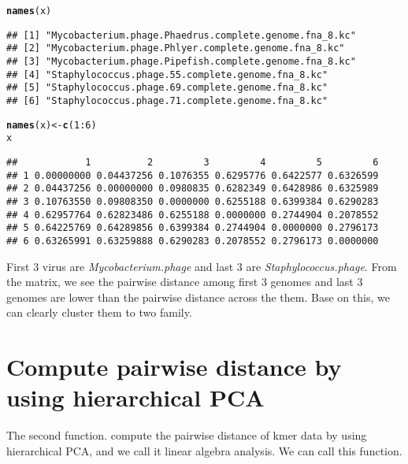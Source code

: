 \documentclass{article}\usepackage[]{graphicx}\usepackage[]{color}
\makeatletter
\newcommand{\hlnum}[1]{\textcolor[rgb]{0.686,0.059,0.569}{#1}}%
\newcommand{\hlopt}[1]{\textcolor[rgb]{0,0,0}{#1}}%
\newcommand{\hlstd}[1]{\textcolor[rgb]{0.345,0.345,0.345}{#1}}%
\newcommand{\hlkwb}[1]{\textcolor[rgb]{0.69,0.353,0.396}{#1}}%
\newcommand{\hlkwd}[1]{\textcolor[rgb]{0.737,0.353,0.396}{\textbf{#1}}}%
\newenvironment{kframe}{%
 \def\at@end@of@kframe{}%
 \ifinner\ifhmode%
  \def\at@end@of@kframe{\end{minipage}}%
  \begin{minipage}{\columnwidth}%
 \fi\fi%
 \def\FrameCommand##1{\hskip\@totalleftmargin \hskip-\fboxsep
 \colorbox{shadecolor}{##1}\hskip-\fboxsep
     \hskip-\linewidth \hskip-\@totalleftmargin \hskip\columnwidth}%
 \MakeFramed {\advance\hsize-\width
   \@totalleftmargin\z@ \linewidth\hsize
   \@setminipage}}%
 {\par\unskip\endMakeFramed%
 \at@end@of@kframe}
\newenvironment{knitrout}{}{} %
\makeatother
\begin{document}
\begin{knitrout}
\color{fgcolor}\begin{kframe}
\begin{alltt}
\hlkwd{names}\hlstd{(x)}
\end{alltt}
\begin{verbatim}
## [1] "Mycobacterium.phage.Phaedrus.complete.genome.fna_8.kc"
## [2] "Mycobacterium.phage.Phlyer.complete.genome.fna_8.kc"  
## [3] "Mycobacterium.phage.Pipefish.complete.genome.fna_8.kc"
## [4] "Staphylococcus.phage.55.complete.genome.fna_8.kc"     
## [5] "Staphylococcus.phage.69.complete.genome.fna_8.kc"     
## [6] "Staphylococcus.phage.71.complete.genome.fna_8.kc"
\end{verbatim}
\begin{alltt}
\hlkwd{names}\hlstd{(x)} \hlkwb{<-} \hlkwd{c}\hlstd{(}\hlnum{1}\hlopt{:}\hlnum{6}\hlstd{)}
\hlstd{x}
\end{alltt}
\begin{verbatim}
##            1          2         3         4         5         6
## 1 0.00000000 0.04437256 0.1076355 0.6295776 0.6422577 0.6326599
## 2 0.04437256 0.00000000 0.0980835 0.6282349 0.6428986 0.6325989
## 3 0.10763550 0.09808350 0.0000000 0.6255188 0.6399384 0.6290283
## 4 0.62957764 0.62823486 0.6255188 0.0000000 0.2744904 0.2078552
## 5 0.64225769 0.64289856 0.6399384 0.2744904 0.0000000 0.2796173
## 6 0.63265991 0.63259888 0.6290283 0.2078552 0.2796173 0.0000000
\end{verbatim}
\end{kframe}
\end{knitrout}

First 3 virus are \emph{Mycobacterium.phage} and last 3 are \emph{Staphylococcus.phage}. From the matrix, we see the pairwise distance among first 3 genomes and last 3 genomes are lower than the pairwise distance across the them. Base on this, we can clearly cluster them to two family.\\


\section{Compute pairwise distance by using hierarchical PCA}
\label{Finch.hpca}

The second function.  compute the pairwise distance of kmer data by using hierarchical PCA, and we call it linear algebra analysis. We can call this function.
\end{document}
